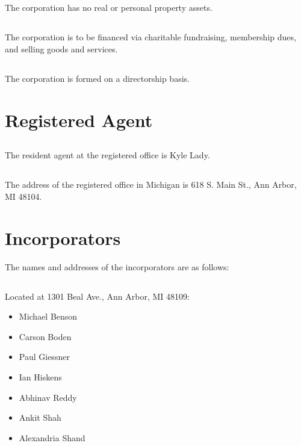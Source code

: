 \documentclass[incorporation,proposal,withoutpreface,withoutoptional,11pt,final]{bylaws}
\begin{document}
\section{} The corporation has no real or personal property assets.

\section{} The corporation is to be financed via charitable fundraising, membership dues, and selling goods and services.

\section{} The corporation is formed on a directorship basis.

\chapter{Registered Agent}
\section{} The resident agent at the registered office is Kyle Lady.

\section{} The address of the registered office in Michigan is 618 S. Main St., Ann Arbor, MI 48104.

\chapter{Incorporators}
The names and addresses of the incorporators are as follows:
\section{} Located at 1301 Beal Ave., Ann Arbor, MI 48109:
\begin{itemize}
	\item Michael Benson
	\item Carson Boden
	\item Paul Giessner
	\item Ian Hiskens
	\item Abhinav Reddy
	\item Ankit Shah
	\item Alexandria Shand
\end{itemize}
\end{document}
